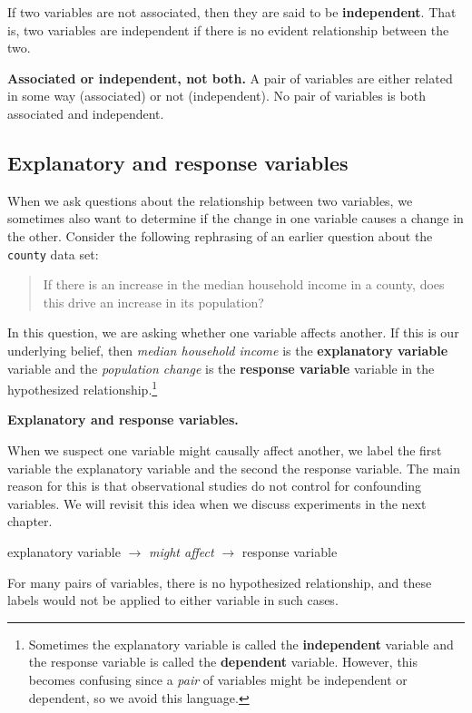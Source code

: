 \documentclass[
  10pt,
  openany]{book}
\theoremstyle{definition}
\theoremstyle{definition}
\theoremstyle{definition}
\theoremstyle{definition}
\theoremstyle{remark}
\begin{document}
If two variables are not associated, then they are said to be \textbf{independent}.
That is, two variables are independent if there is no evident relationship between the two.

\textbf{Associated or independent, not both.}
A pair of variables are either related in some way (associated) or not (independent).
No pair of variables is both associated and independent.

\subsection{Explanatory and response variables}\label{explanatory-and-response-variables}

When we ask questions about the relationship between two variables, we sometimes also want to determine if the change in one variable causes a change in the other.
Consider the following rephrasing of an earlier question about the \texttt{county} data set:

\begin{quote}
If there is an increase in the median household income in a county, does this drive an increase in its population?
\end{quote}

In this question, we are asking whether one variable affects another.
If this is our underlying belief, then \emph{median household income} is the \textbf{explanatory variable} variable and the \emph{population change} is the \textbf{response variable} variable in the hypothesized relationship.\footnote{Sometimes the explanatory variable is called the \textbf{independent} variable and the response variable is called the \textbf{dependent} variable. However, this becomes confusing since a \emph{pair} of variables might be independent or dependent, so we avoid this language.}


\textbf{Explanatory and response variables.}

When we suspect one variable might causally affect another,
we label the first variable the explanatory variable
and the second the response variable.
The main reason for this is that observational studies do not control for confounding variables.
We will revisit this idea when we discuss experiments in the next chapter.

explanatory variable \(\rightarrow\) \emph{might affect} \(\rightarrow\) response variable

For many pairs of variables, there is no hypothesized relationship, and these labels would not be applied to either variable in such cases.
\end{document}
